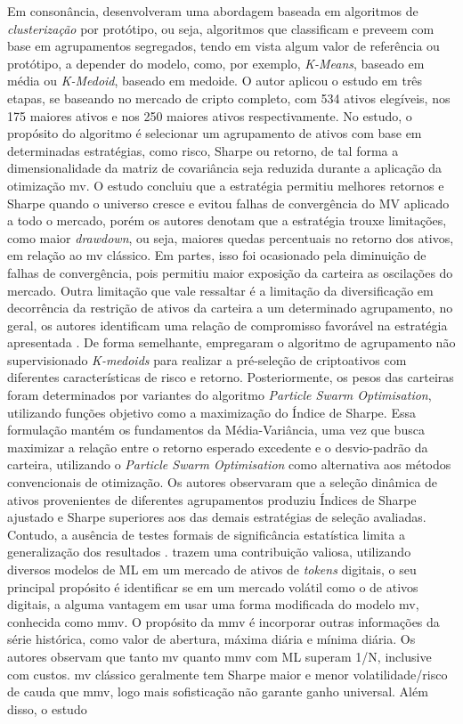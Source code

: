 Em consonância,  desenvolveram uma abordagem baseada em algoritmos de \textit{clusterização} por protótipo, ou seja, algoritmos que classificam e preveem com base em agrupamentos segregados, tendo em vista algum valor de referência ou protótipo, a depender do modelo, como, por exemplo, \textit{K-Means}, baseado em média ou \textit{K-Medoid}, baseado em medoide. O autor aplicou o estudo em três etapas, se baseando no mercado de cripto completo, com 534 ativos elegíveis, nos 175 maiores ativos e nos 250 maiores ativos respectivamente. No estudo, o propósito do algoritmo é selecionar um agrupamento de ativos com base em determinadas estratégias, como risco, Sharpe ou retorno, de tal forma a dimensionalidade da matriz de covariância seja reduzida durante a aplicação da otimização \acs{mv}. O estudo concluiu que a estratégia permitiu melhores retornos e Sharpe quando o universo cresce e evitou falhas de convergência do MV aplicado a todo o mercado, porém os autores denotam que a estratégia trouxe limitações, como maior \textit{drawdown}, ou seja, maiores quedas percentuais no retorno dos ativos, em relação ao \acs{mv} clássico. Em partes, isso foi ocasionado pela diminuição de falhas de convergência, pois permitiu maior exposição da carteira as oscilações do mercado. Outra limitação que vale ressaltar é a limitação da diversificação em decorrência da restrição de ativos da carteira a um determinado agrupamento, no geral, os autores identificam uma relação de compromisso favorável na estratégia apresentada \cite{lorenzo2023online}. De forma semelhante,  empregaram o algoritmo de agrupamento não supervisionado \textit{K-medoids} para realizar a pré-seleção de criptoativos com diferentes características de risco e retorno. Posteriormente, os pesos das carteiras foram determinados por variantes do algoritmo \textit{Particle Swarm Optimisation}, utilizando funções objetivo como a maximização do Índice de Sharpe. Essa formulação mantém os fundamentos da Média-Variância, uma vez que busca maximizar a relação entre o retorno esperado excedente e o desvio-padrão da carteira, utilizando o \textit{Particle Swarm Optimisation} como alternativa aos métodos convencionais de otimização. Os autores observaram que a seleção dinâmica de ativos provenientes de diferentes agrupamentos produziu Índices de Sharpe ajustado e Sharpe superiores aos das demais estratégias de seleção avaliadas. Contudo, a ausência de testes formais de significância estatística limita a generalização dos resultados \cite{bulani2025improving}.  trazem uma contribuição valiosa, utilizando diversos modelos de ML em um mercado de ativos de \textit{tokens} digitais, o seu principal propósito é identificar se em um mercado volátil como o de ativos digitais, a alguma vantagem em usar uma forma modificada do modelo \acs{mv}, conhecida como \ac{mmv}. O propósito da \acs{mmv} é incorporar outras informações da série histórica, como valor de abertura, máxima diária e mínima diária. Os autores observam que tanto \acs{mv} quanto \acs{mmv} com ML superam 1/N, inclusive com custos. \acs{mv} clássico geralmente tem Sharpe maior e menor volatilidade/risco de cauda que \acs{mmv}, logo mais sofisticação não garante ganho universal. Além disso, o estudo 